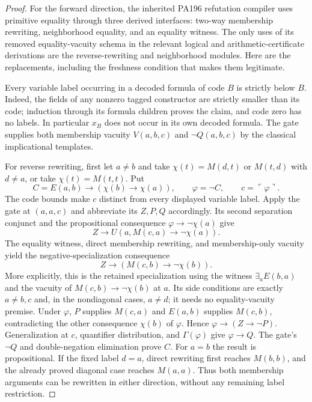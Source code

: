 \begin{proof}
For the forward direction, the inherited PA196 refutation compiler uses
primitive equality through three derived interfaces: two-way membership
rewriting, neighborhood equality, and an equality witness.  The only
uses of its removed equality-vacuity schema in the relevant logical and
arithmetic-certificate derivations are the reverse-rewriting and
neighborhood modules.  Here are the replacements, including the
freshness condition that makes them legitimate.

Every variable label occurring in a decoded formula of code $B$ is
strictly below $B$.  Indeed, the fields of any nonzero tagged constructor
are strictly smaller than its code; induction through its formula
children proves the claim, and code zero has no labels.  In particular
$x_B$ does not occur in its own decoded formula.  The gate supplies both
membership vacuity $V(a,b,c)$ and $\neg Q(a,b,c)$ by the classical
implicational templates.

For reverse rewriting, first let $a\ne b$ and take
$\chi(t)=M(d,t)$ or $M(t,d)$ with $d\ne a$, or take
$\chi(t)=M(t,t)$.  Put
\[
 C=E(a,b)\to(\chi(b)\to\chi(a)),\qquad
 \varphi=\neg C,\qquad c=\ulcorner\varphi\urcorner.
\]
The code bounds make $c$ distinct from every displayed variable label.
Apply the gate at $(a,a,c)$ and abbreviate its $Z,P,Q$ accordingly.
Its second separation conjunct and the propositional consequence
$\varphi\to\neg\chi(a)$ give
\[
 Z\to U(a,M(c,a)\to\neg\chi(a)).
\]
The equality witness, direct membership rewriting, and membership-only
vacuity yield the negative-specialization consequence
\[
 Z\to(M(c,b)\to\neg\chi(b)).
\]
More explicitly, this is the retained specialization using the witness
$\exists_a E(b,a)$ and the vacuity of
$M(c,b)\to\neg\chi(b)$ at $a$.  Its side conditions are exactly
$a\ne b,c$ and, in the nondiagonal cases, $a\ne d$; it needs no
equality-vacuity premise.  Under $\varphi$, $P$ supplies $M(c,a)$ and
$E(a,b)$ supplies $M(c,b)$, contradicting the other consequence
$\chi(b)$ of $\varphi$.  Hence
$\varphi\to(Z\to\neg P)$.  Generalization at $c$, quantifier
distribution, and $\Gamma(\varphi)$ give $\varphi\to Q$.
The gate's $\neg Q$ and double-negation elimination prove $C$.
For $a=b$ the result is propositional.  If the fixed label $d=a$,
direct rewriting first reaches $M(b,b)$, and the already proved diagonal
case reaches $M(a,a)$.  Thus both membership arguments can be rewritten
in either direction, without any remaining label restriction.


\end{proof}

